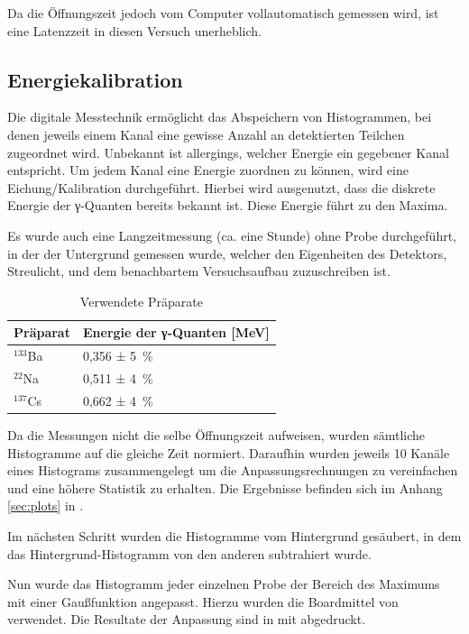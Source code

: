 Da die Öffnungszeit jedoch vom Computer vollautomatisch
gemessen wird, ist eine Latenzzeit in diesen Versuch unerheblich.

\subsection{Energiekalibration}

Die digitale Messtechnik ermöglicht das Abspeichern von Histogrammen, bei denen
jeweils einem Kanal eine gewisse Anzahl an detektierten Teilchen zugeordnet
wird. Unbekannt ist allergings, welcher Energie ein gegebener Kanal entspricht.
Um jedem Kanal eine Energie zuordnen zu können, wird eine Eichung/Kalibration
durchgeführt. Hierbei wird ausgenutzt, dass die diskrete Energie der γ-Quanten
bereits bekannt ist. Diese Energie führt zu den Maxima.

Es wurde auch eine Langzeitmessung (ca. eine Stunde)
ohne Probe durchgeführt, in der der Untergrund gemessen wurde, welcher den
Eigenheiten des Detektors, Streulicht, und dem benachbartem Versuchsaufbau
zuzuschreiben ist.

\begin{table}[htbp]
\centering
\begin{tabular*}{\columnwidth}{%
l%
l}
\toprule
{Präparat} & {Energie der γ-Quanten [\si{\mega\eV}]} \\
\midrule
$^{133}$Ba & 0,356 ± \SI{5}{\percent} \\
$^{22}$Na & 0,511 ± \SI{4}{\percent} \\
$^{137}$Cs & 0,662 ± \SI{4}{\percent} \\
\bottomrule
\end{tabular*}
\label{tab:proben}
\caption{Verwendete Präparate}
\end{table}

Da die Messungen nicht die selbe Öffnungszeit aufweisen, wurden sämtliche
Histogramme auf die gleiche Zeit normiert. Daraufhin wurden jeweils 10 Kanäle
eines Histograms zusammengelegt um die Anpassungsrechnungen zu vereinfachen und
eine höhere Statistik zu erhalten. Die Ergebnisse befinden sich im Anhang
\ref{sec:plots} in .

Im nächsten Schritt wurden die Histogramme vom Hintergrund gesäubert, in dem
das Hintergrund-Histogramm von den anderen subtrahiert wurde.

Nun wurde das Histogramm jeder einzelnen Probe der Bereich des Maximums mit einer
Gaußfunktion angepasst. Hierzu wurden die Boardmittel von \cite{root} verwendet.
Die Resultate der Anpassung sind in  mit abgedruckt.

